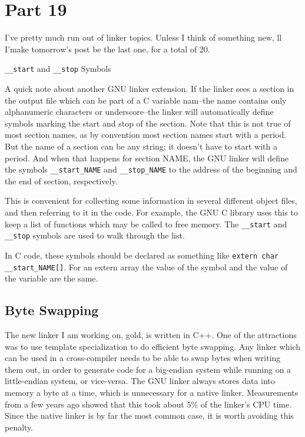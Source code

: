 \section{Part 19}

I've pretty much run out of linker topics. Unless I think of something new, ll
I'make tomorrow's post be the last one, for a total of 20.

\texttt{\_\_start} and \texttt{\_\_stop} Symbols

A quick note about another GNU linker extension. If the linker sees a section
in the output file which can be part of a C variable nam--the name contains
only alphanumeric characters or underscore--the linker will automatically
define symbols marking the start and stop of the section. Note that this is not
true of most section names, as by convention most section names start with a
period. But the name of a section can be any string; it doesn't have to start
with a period. And when that happens for section NAME, the GNU linker will
define the symbols \texttt{\_\_start\_NAME} and \texttt{\_\_stop\_NAME} to the
address of the beginning and the end of section, respectively.

This is convenient for collecting some information in several different object
files, and then referring to it in the code. For example, the GNU C library
uses this to keep a list of functions which may be called to free memory. The
\texttt{\_\_start} and \texttt{\_\_stop} symbols are used to walk through the
list.

In C code, these symbols should be declared as something like \texttt{extern
char \_\_start\_NAME[]}. For an extern array the value of the symbol and the
value of the variable are the same.

\subsection{Byte Swapping}

The new linker I am working on, gold, is written in C++. One of the attractions
was to use template specialization to do efficient byte swapping. Any linker
which can be used in a cross-compiler needs to be able to swap bytes when
writing them out, in order to generate code for a big-endian system while
running on a little-endian system, or vice-versa. The GNU linker always stores
data into memory a byte at a time, which is unnecessary for a native linker.
Measurements from a few years ago showed that this took about 5\% of the
linker's CPU time. Since the native linker is by far the most common case, it
is worth avoiding this penalty.


